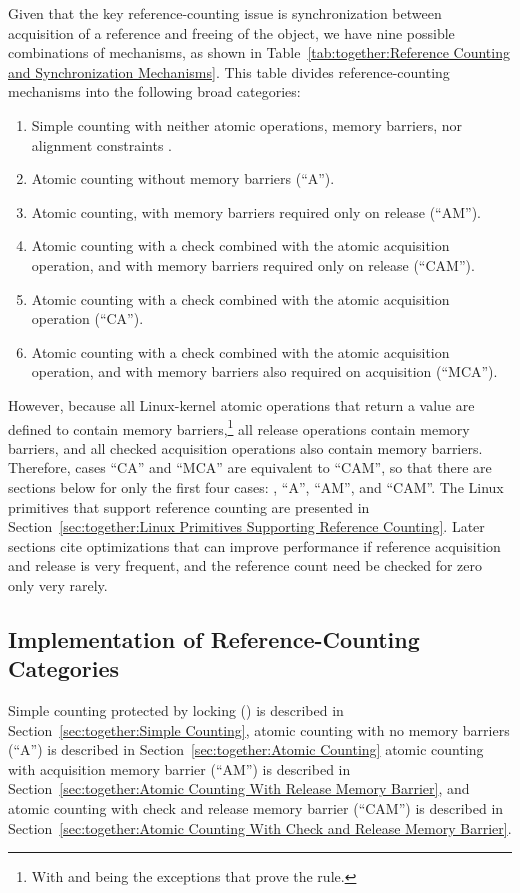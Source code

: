 Given that the key reference-counting issue
is synchronization between acquisition
of a reference and freeing of the object, we have nine possible
combinations of mechanisms, as shown in
Table~\ref{tab:together:Reference Counting and Synchronization Mechanisms}.
This table
divides reference-counting mechanisms into the following broad categories:
\begin{enumerate}
\item	Simple counting with neither atomic operations, memory
	barriers, nor alignment constraints .
\item	Atomic counting without memory barriers (``A'').
\item	Atomic counting, with memory barriers required only on release
	(``AM'').
\item	Atomic counting with a check combined with the atomic acquisition
	operation, and with memory barriers required only on release
	(``CAM'').
\item	Atomic counting with a check combined with the atomic acquisition
	operation (``CA'').
\item	Atomic counting with a check combined with the atomic acquisition
	operation, and with memory barriers also required on acquisition
	(``MCA'').
\end{enumerate}
However, because all Linux-kernel atomic operations that return a
value are defined to contain memory barriers,\footnote{
	With  and  being the
	exceptions that prove the rule.}
all release operations
contain memory barriers, and all checked acquisition operations also
contain memory barriers.
Therefore, cases ``CA'' and ``MCA'' are equivalent to ``CAM'', so that
there are sections below for only the first four cases:
, ``A'', ``AM'', and ``CAM''.
The Linux primitives that support reference counting are presented in
Section~\ref{sec:together:Linux Primitives Supporting Reference Counting}.
Later sections cite optimizations that can improve performance
if reference acquisition and release is very frequent, and the
reference count need be checked for zero only very rarely.

\subsection{Implementation of Reference-Counting Categories}
\label{sec:together:Implementation of Reference-Counting Categories}

Simple counting protected by locking () is described in
Section~\ref{sec:together:Simple Counting},
atomic counting with no memory barriers (``A'') is described in
Section~\ref{sec:together:Atomic Counting}
atomic counting with acquisition memory barrier (``AM'') is described in
Section~\ref{sec:together:Atomic Counting With Release Memory Barrier},
and
atomic counting with check and release memory barrier (``CAM'') is described in
Section~\ref{sec:together:Atomic Counting With Check and Release Memory Barrier}.

